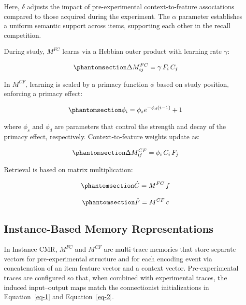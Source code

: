 \documentclass[
  letterpaper,
  11pt,
  english,
  singlespacing,
  headsepline]{MastersDoctoralThesis}
\begin{document}
Here, \(\delta\) adjusts the impact of pre-experimental
context-to-feature associations compared to those acquired during the
experiment. The \(\alpha\) parameter establishes a uniform semantic
support across items, supporting each other in the recall competition.

During study, \(M^{FC}\) learns via a Hebbian outer product with
learning rate \(\gamma\):

\begin{equation}\phantomsection\label{eq-3}{
\Delta M^{FC}_{ij} = \gamma\, F_i\, C_j
}\end{equation}

In \(M^{CF}\), learning is scaled by a primacy function \(\phi\) based
on study position, enforcing a primacy effect:

\begin{equation}\phantomsection\label{eq-4}{ 
\phi_i = \phi_se^{-\phi_d(i-1)} + 1
}\end{equation}

where \(\phi_s\) and \(\phi_d\) are parameters that control the strength
and decay of the primacy effect, respectively. Context-to-feature
weights update as:

\begin{equation}\phantomsection\label{eq-5}{
\Delta M^{CF}_{ij} = \phi_i\, C_i\, F_j
}\end{equation}

Retrieval is based on matrix multiplication:

\begin{equation}\phantomsection\label{eq-6}{
\hat{C} = M^{FC}\, f
}\end{equation}

\begin{equation}\phantomsection\label{eq-7}{
\hat{F} = M^{CF}\, c
}\end{equation}

\subsection{Instance-Based Memory
Representations}\label{instance-based-memory-representations}

In Instance CMR, \(M^{FC}\) and \(M^{CF}\) are multi-trace memories that
store separate vectors for pre-experimental structure and for each
encoding event via concatenation of an item feature vector and a context
vector. Pre-experimental traces are configured so that, when combined
with experimental traces, the induced input--output maps match the
connectionist initializations in Equation~\ref{eq-1} and
Equation~\ref{eq-2}.
\end{document}
